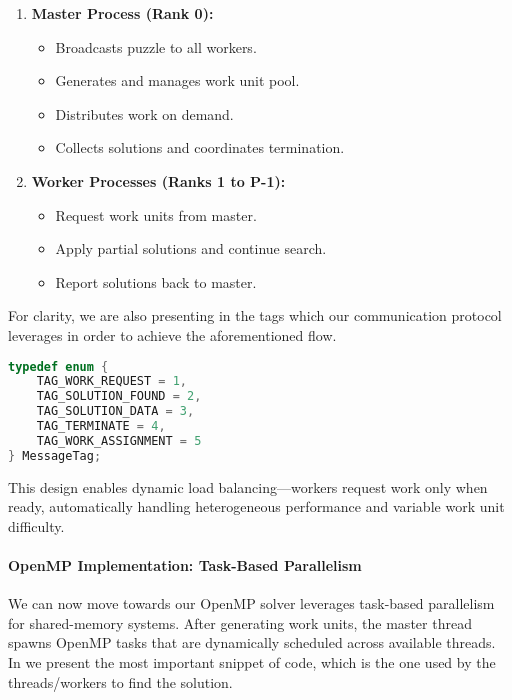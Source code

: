 \begin{enumerate}
    \item \textbf{Master Process (Rank 0):}
    \begin{itemize}
        \item Broadcasts puzzle to all workers.
        \item Generates and manages work unit pool.
        \item Distributes work on demand.
        \item Collects solutions and coordinates termination.
    \end{itemize}
    
    \item \textbf{Worker Processes (Ranks 1 to P-1):}
    \begin{itemize}
        \item Request work units from master.
        \item Apply partial solutions and continue search.
        \item Report solutions back to master.
    \end{itemize}
\end{enumerate}

For clarity, we are also presenting in  the tags which our communication protocol leverages in order to achieve the aforementioned flow.

\begin{lstlisting}[language=C, caption=MPI communication tags, label={listing:message_tags}]
typedef enum {
    TAG_WORK_REQUEST = 1,
    TAG_SOLUTION_FOUND = 2,
    TAG_SOLUTION_DATA = 3,
    TAG_TERMINATE = 4,
    TAG_WORK_ASSIGNMENT = 5
} MessageTag;
\end{lstlisting}
This design enables dynamic load balancing—workers request work only when ready, automatically handling heterogeneous performance and variable work unit difficulty.


\paragraph{OpenMP Implementation: Task-Based Parallelism}
\label{par:omp_implementation}
We can now move towards our OpenMP solver leverages task-based parallelism for shared-memory systems. After generating work units, the master thread spawns OpenMP tasks that are dynamically scheduled across available threads. In  we present the most important snippet of code, which is the one used by the threads/workers to find the solution.

